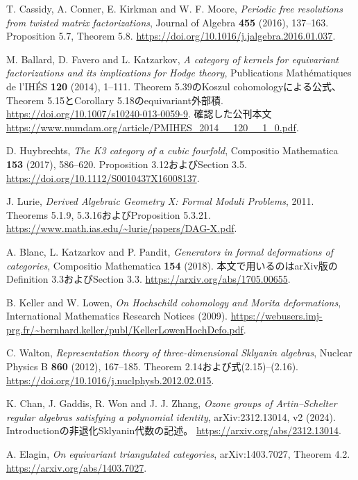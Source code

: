 T. Cassidy, A. Conner, E. Kirkman and W. F. Moore,
\emph{Periodic free resolutions from twisted matrix factorizations},
Journal of Algebra \textbf{455} (2016), 137--163.
Proposition 5.7, Theorem 5.8.
\url{https://doi.org/10.1016/j.jalgebra.2016.01.037}.

M. Ballard, D. Favero and L. Katzarkov,
\emph{A category of kernels for equivariant factorizations and its implications for Hodge theory},
Publications Mathématiques de l'IHÉS \textbf{120} (2014), 1--111.
Theorem 5.39のKoszul cohomologyによる公式、Theorem 5.15とCorollary 5.18のequivariant外部積.
\url{https://doi.org/10.1007/s10240-013-0059-9}.
確認した公刊本文 \url{https://www.numdam.org/article/PMIHES_2014__120__1_0.pdf}.

D. Huybrechts, \emph{The K3 category of a cubic fourfold},
Compositio Mathematica \textbf{153} (2017), 586--620.
Proposition 3.12およびSection 3.5.
\url{https://doi.org/10.1112/S0010437X16008137}.

J. Lurie, \emph{Derived Algebraic Geometry X: Formal Moduli Problems},
2011. Theorems 5.1.9, 5.3.16およびProposition 5.3.21.
\url{https://www.math.ias.edu/~lurie/papers/DAG-X.pdf}.

A. Blanc, L. Katzarkov and P. Pandit,
\emph{Generators in formal deformations of categories},
Compositio Mathematica \textbf{154} (2018).
本文で用いるのはarXiv版のDefinition 3.3およびSection 3.3.
\url{https://arxiv.org/abs/1705.00655}.

B. Keller and W. Lowen,
\emph{On Hochschild cohomology and Morita deformations},
International Mathematics Research Notices (2009).
\url{https://webusers.imj-prg.fr/~bernhard.keller/publ/KellerLowenHochDefo.pdf}.

C. Walton, \emph{Representation theory of three-dimensional Sklyanin algebras},
Nuclear Physics B \textbf{860} (2012), 167--185.
Theorem 2.14および式(2.15)--(2.16).
\url{https://doi.org/10.1016/j.nuclphysb.2012.02.015}.

K. Chan, J. Gaddis, R. Won and J. J. Zhang,
\emph{Ozone groups of Artin--Schelter regular algebras satisfying a polynomial identity},
arXiv:2312.13014, v2 (2024). Introductionの非退化Sklyanin代数の記述。
\url{https://arxiv.org/abs/2312.13014}.

A. Elagin, \emph{On equivariant triangulated categories},
arXiv:1403.7027, Theorem 4.2.
\url{https://arxiv.org/abs/1403.7027}.


